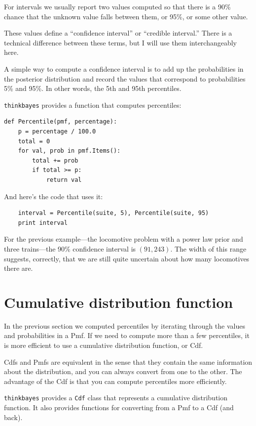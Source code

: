 \documentclass[12pt]{book}
\begin{document}
For intervals we usually report two values computed
so that there is a 90\% chance that the unknown value falls
between them, or 95\%, or some other value.

These values define a ``confidence interval'' or ``credible interval.''
There is a technical difference between these terms, but I will
use them interchangeably here.

A simple way to compute a confidence interval is to add up the
probabilities in the posterior distribution and record the values
that correspond to probabilities 5\% and 95\%.  In other words,
the 5th and 95th percentiles.

\verb"thinkbayes" provides a function that computes percentiles:

\begin{verbatim}
def Percentile(pmf, percentage):
    p = percentage / 100.0
    total = 0
    for val, prob in pmf.Items():
        total += prob
        if total >= p:
            return val    
\end{verbatim}

And here's the code that uses it:

\begin{verbatim}
    interval = Percentile(suite, 5), Percentile(suite, 95)
    print interval
\end{verbatim}

For the previous example---the locomotive problem with a power law prior
and three trains---the 90\% confidence interval is $(91, 243)$.  The
width of this range suggests, correctly, that we are still quite
uncertain about how many locomotives there are.


\section{Cumulative distribution function}

In the previous section we computed percentiles by iterating through
the values and probabilities in a Pmf.  If we need to compute more
than a few percentiles, it is more efficient to use a cumulative
distribution function, or Cdf.

Cdfs and Pmfs are equivalent in the sense that they contain the
same information about the distribution, and you can always convert
from one to the other.  The advantage of the Cdf is that you can
compute percentiles more efficiently.

{\tt thinkbayes} provides a {\tt Cdf} class that represents a
cumulative distribution function.  It also provides functions for
converting from a Pmf to a Cdf (and back). 
\end{document}
